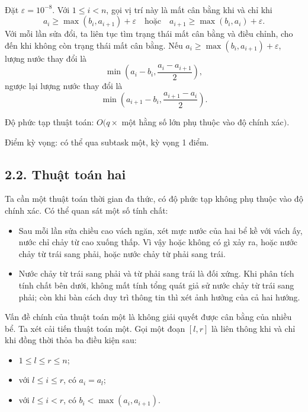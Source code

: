 \documentclass[11pt]{article}
\begin{document}
\paragraph{}
Đặt \(\varepsilon=10^{-8}\). Với \(1\le i<n\), gọi vị trí này là mất cân bằng
khi và chỉ khi
\[
  a_i\ge \max(b_i,a_{i+1})+\varepsilon
  \quad\text{hoặc}\quad
  a_{i+1}\ge \max(b_i,a_i)+\varepsilon.
\]
Với mỗi lần sửa đổi, ta liên tục tìm trạng thái mất cân bằng và điều chỉnh,
cho đến khi không còn trạng thái mất cân bằng. Nếu
\(a_i\ge \max(b_i,a_{i+1})+\varepsilon\), lượng nước thay đổi là
\[
  \min\left(a_i-b_i,\frac{a_i-a_{i+1}}{2}\right),
\]
ngược lại lượng nước thay đổi là
\[
  \min\left(a_{i+1}-b_i,\frac{a_{i+1}-a_i}{2}\right).
\]

Độ phức tạp thuật toán: \(O(q\times\) một hằng số lớn phụ thuộc vào độ chính
xác\()\).

Điểm kỳ vọng: có thể qua subtask một, kỳ vọng 1 điểm.

\subsection*{2.2. Thuật toán hai}

Ta cần một thuật toán thời gian đa thức, có độ phức tạp không phụ thuộc vào
độ chính xác. Có thể quan sát một số tính chất:

\begin{itemize}
  \item Sau mỗi lần sửa chiều cao vách ngăn, xét mực nước của hai bể kề với
        vách ấy, nước chỉ chảy từ cao xuống thấp. Vì vậy hoặc không có gì xảy
        ra, hoặc nước chảy từ trái sang phải, hoặc nước chảy từ phải sang
        trái.
  \item Nước chảy từ trái sang phải và từ phải sang trái là đối xứng. Khi
        phân tích tính chất bên dưới, không mất tính tổng quát giả sử nước
        chảy từ trái sang phải; còn khi bàn cách duy trì thông tin thì xét
        ảnh hưởng của cả hai hướng.
\end{itemize}

Vấn đề chính của thuật toán một là không giải quyết được cân bằng của nhiều
bể. Ta xét cải tiến thuật toán một. Gọi một đoạn \([l,r]\) là liên thông khi
và chỉ khi đồng thời thỏa ba điều kiện sau:

\begin{itemize}
  \item \(1\le l\le r\le n\);
  \item với \(l\le i\le r\), có \(a_i=a_l\);
  \item với \(l\le i<r\), có \(b_i<\max(a_i,a_{i+1})\).
\end{itemize}
\end{document}
